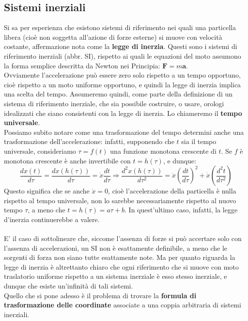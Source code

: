 \documentclass[a4paper,11pt]{book}
\theoremstyle{plain}
\theoremstyle{definition}
\begin{document}
\subsection{Sistemi inerziali}
Si sa per esperienza che esistono sistemi di riferimento nei quali una particella libera (cioè 
non soggetta all'azione di forze esterne) si muove con velocità costante, affermazione nota come la \textbf{legge di inerzia}. Questi sono i sistemi di riferimento inerziali (abbr. SI), rispetto ai quali le equazioni del moto assumono la forma semplice descritta da Newton nei Principia: $\textbf{F}=m\textbf{a}$. \\
Ovviamente l'accelerazione può essere zero solo rispetto a un tempo opportuno, cioè 
rispetto a un moto uniforme opportuno, e quindi la legge di inerzia implica una scelta 
del tempo. Assumeremo quindi, come parte della definizione di un sistema di riferimento 
inerziale, che sia possibile costruire, o usare, orologi idealizzati che siano consistenti con 
la legge di inerzia. Lo chiameremo il \textbf{tempo universale}. \\
Possiamo subito notare come una trasformazione del tempo determini anche una trasformazione dell'accelerazione: infatti, supponendo che $t$ sia il tempo universale, consideriamo $\tau=f(t)$ una funzione monotona crescente di $t$. Se $f$ è monotona crescente è anche invertibile con $t=h(\tau)$, e dunque:
\[
\frac{dx(t)}{d\tau}=\frac{dx(h(\tau))}{d\tau}=\dot x \frac{dt}{d\tau} \Longrightarrow \frac{d^2x(h(\tau))}{d\tau^2}=\ddot x \left( \frac{dt}{d\tau} \right)^2+\dot x \left(  \frac{d^2t}{d\tau^2}\right)
\]
Questo significa che se anche $\ddot x=0$, cioè l'accelerazione della particella è nulla rispetto al tempo universale, non lo sarebbe necessariamente rispetto al nuovo tempo $\tau$, a meno che $t=h(\tau)=a\tau+b$. In quest'ultimo caso, infatti, la legge d'inerzia continuerebbe a valere. 
\\ \\
E' il caso di sottolineare che, siccome l'assenza di forze si può accertare solo con 
l'assenza di accelerazioni, un SI non è esattamente definibile, a meno che le sorgenti 
di forza non siano tutte esattamente note. Ma per quanto riguarda la legge di inerzia è 
altrettanto chiaro che ogni riferimento che si muove con moto traslatorio uniforme rispetto 
a un sistema inerziale è esso stesso inerziale, e dunque che esiste un'infinità di tali sistemi. \\
Quello che si pone adesso è il problema di trovare la \textbf{formula di trasformazione delle coordinate} associate a una 
coppia arbitraria di sistemi inerziali.
\end{document}
